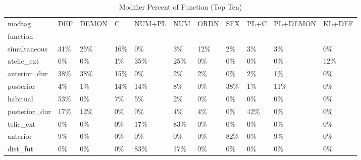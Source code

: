 \begin{table}[htbp!]
\centering
\caption{Modifier Percent of Function (Top Ten)}
\label{table:afmod_pc}
\begin{adjustbox}{width=1\textwidth}
\begin{tabular}{lllllllllll}
\toprule
modtag &  DEF & DEMON &    C & NUM+PL &  NUM & ORDN &  SFX & PL+C & PL+DEMON & KL+DEF \\
function      &      &       &      &        &      &      &      &      &          &        \\
\midrule
simultaneous  &  31\% &   25\% &  16\% &     0\% &   3\% &  12\% &   2\% &   3\% &       3\% &     0\% \\
atelic\_ext    &   0\% &    0\% &   1\% &    35\% &  25\% &   0\% &   0\% &   0\% &       0\% &    12\% \\
anterior\_dur  &  38\% &   38\% &  15\% &     0\% &   2\% &   2\% &   0\% &   2\% &       1\% &     0\% \\
posterior     &   4\% &    1\% &  14\% &    14\% &   8\% &   0\% &  38\% &   1\% &      11\% &     0\% \\
habitual      &  53\% &    0\% &   7\% &     5\% &   2\% &   0\% &   0\% &   0\% &       0\% &     0\% \\
posterior\_dur &  17\% &   12\% &   0\% &     0\% &   4\% &   4\% &   0\% &  42\% &       0\% &     0\% \\
telic\_ext     &   0\% &    0\% &   0\% &    17\% &  83\% &   0\% &   0\% &   0\% &       0\% &     0\% \\
anterior      &   9\% &    0\% &   0\% &     0\% &   0\% &   0\% &  82\% &   0\% &       9\% &     0\% \\
dist\_fut      &   0\% &    0\% &   0\% &    83\% &  17\% &   0\% &   0\% &   0\% &       0\% &     0\% \\
\bottomrule
\end{tabular}
\end{adjustbox}
\end{table}

